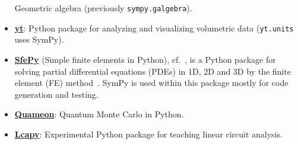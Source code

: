 \begin{itemize}
  Geometric algebra (previously \texttt{sympy.galgebra}).
\item
  \href{http://yt-project.org/}{\textbf{yt}}: Python package for
  analyzing and visualizing volumetric data (\texttt{yt.units} uses SymPy).
\item
  \href{http://sfepy.org/}{\textbf{SfePy}} (Simple finite elements in Python),
  cf.~\cite{cimrman2014sfepy}, is a Python package for solving partial
  differential equations (PDEs) in 1D, 2D and 3D by the finite element (FE)
  method~\cite{Zienkiewicz2013FEM}. SymPy is used within this package mostly for
  code generation and testing.
\item
  \href{http://quameon.sourceforge.net/}{\textbf{Quameon}}: Quantum
  Monte Carlo in Python.
\item
  \href{http://lcapy.elec.canterbury.ac.nz/}{\textbf{Lcapy}}:
  Experimental Python package for teaching linear circuit analysis.
\end{itemize}

